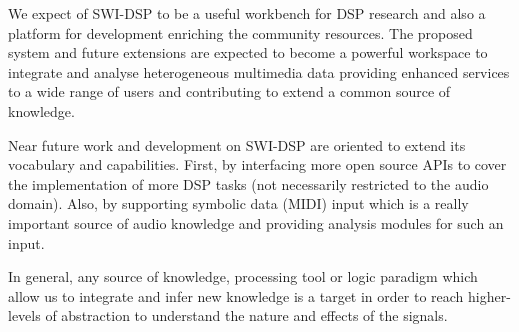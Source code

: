 \documentclass[runningheads]{llncs}
\begin{document}
We expect of SWI-DSP to be a useful workbench for DSP research and also a platform for development enriching the community resources. The proposed system and future extensions are expected to become a powerful workspace to integrate and analyse heterogeneous multimedia data providing enhanced services to a wide range of users and contributing to extend a common source of knowledge.

Near future work and development on SWI-DSP are oriented to extend its vocabulary and capabilities. First, by interfacing more open source APIs to cover the implementation of more DSP tasks (not necessarily restricted to the audio domain). Also, by supporting symbolic data (MIDI) input which is a really important source of audio knowledge and providing analysis modules for such an input.

In general, any source of knowledge, processing tool or logic paradigm which allow us to integrate and infer new knowledge is a target in order to reach higher-levels of abstraction to understand the nature and effects of the signals.
\end{document}
